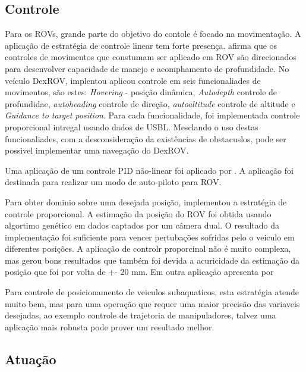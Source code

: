 \subsection{Controle}
Para os ROVs, grande parte do objetivo do contole é focado na movimentação. A aplicação de   estratégia de  controle linear tem forte presença. \cite{Towards} afirma que os controles de movimentos que constumam ser aplicado em ROV são direcionados para desenvolver capacidade de manejo e acomphamento de profundidade. No veículo DexROV, \cite{desgin_joy} implentou aplicou controle em  seis funcionaliades de movimentos, são estes: \textit{Hovering} - posição dinâmica, \textit{Autodepth} controle de profundidae, \textit{autoheading} controle de direção, \textit{autoaltitude} controle de altitude e \textit{Guidance to target position}. Para cada funcionalidade, foi implementada controle proporcional intregal usando dados de USBL. Mesclando o uso destas funcionaliades, com a desconsideração  da existências de obstacuslos, pode ser possivel implementar uma navegação do DexROV.

Uma aplicação de um controle PID não-linear foi aplicado por \cite{wireless_joy}. A aplicação foi destinada para realizar um modo de auto-piloto para ROV.

Para obter dominio sobre uma  desejada posição, \cite{visual_serving} implementou a estratégia de controle proporcional. A estimação da posição do ROV foi obtida usando algortimo genético em dados captados por um câmera dual. O resultado da implementação foi suficiente para vencer pertubações sofridas pelo o veiculo em diferentes posições. A aplicação de controlr proporcinal não é muito complexa, mas gerou bons resultados que também foi devida a acuricidade da estimação da posição que foi por volta de +- 20 mm. 
Em outra aplicação apresenta por \cite{dual_eyes}

Para controle de posicionamento de veiculos subaquaticos, esta estratégia atende muito bem, mas para uma operação que requer uma maior precisão das variaveis desejadas, ao exemplo controle de trajetoria de manipuladores, talvez uma aplicação mais robusta pode prover um resultado melhor.  


\subsection{Atuação}

